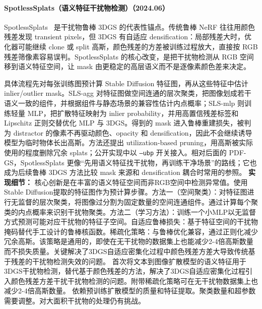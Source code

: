 \paragraph{SpotlessSplats（语义特征干扰物检测）（2024.06）}
SpotlessSplats~\cite{2406_20055} 是干扰物鲁棒 3DGS 的代表性锚点。传统鲁棒 NeRF 往往用颜色残差发现 transient pixels，但 3DGS 有自适应 densification：局部残差大时，优化器可能继续 clone 或 split 高斯，颜色残差的方差被训练过程放大，直接按 RGB 残差筛像素容易误判。SpotlessSplats 的核心改变，是把干扰物检测从 RGB 空间移到语义特征空间，让 mask 由更稳定的高层语义而不是逐像素颜色差来决定。

具体流程先对每张训练图预计算 Stable Diffusion 特征图，再从这些特征中估计 inlier/outlier mask。SLS-agg 对特征图做空间连通的层次聚类，把图像划成若干语义一致的组件，并根据组件与静态场景的兼容性估计内点概率；SLS-mlp 则训练轻量 MLP，把扩散特征映射为 inlier probability，并用高置信残差标签和 Lipschitz 正则交替优化 MLP 与 3DGS。得到的 mask 进入鲁棒重建损失，被判为 distractor 的像素不再驱动颜色、opacity 和 densification，因此不会继续诱导模型为临时物体长出高斯。方法还提出 utilization-based pruning，用高斯被实际使用的程度删除冗余 splats；公开实现中以 \texttt{--ubp} 开关接入。相对后面的 PDF-GS，SpotlessSplats 更像“先用语义特征找干扰物，再训练干净场景”的路线；它也成为后续鲁棒 3DGS 方法比较 mask 来源和 densification 耦合时常用的参照。
\textbf{实现细节：} 核心创新是在丰富的语义特征空间而非RGB空间中检测异常值。使用Stable Diffusion提取的特征图作为预计算步骤。方法一（空间聚类）：对特征图进行无监督的层次聚类，将图像过分割为固定数量的空间连通组件。通过计算每个聚类的内点概率来识别干扰物聚类。方法二（学习方法）：训练一个小MLP以无监督方式预测可能对应干扰物的特征子空间。自适应鲁棒损失：基于特征空间的干扰物掩码替代手工设计的鲁棒核函数。稀疏化策略：与鲁棒优化兼容，通过正则化减少冗余高斯。该策略是通用的，即使在无干扰物的数据集上也能减少2-4倍高斯数量而不损失质量。关键解决了3DGS自适应密集化过程中颜色残差方差大导致传统基于残差的干扰物检测失效的问题。 首次将文本到图像扩散模型的语义特征用于3DGS干扰物检测，替代基于颜色残差的方法，解决了3DGS自适应密集化过程引入颜色残差方差干扰干扰物检测的问题。附带稀疏化策略可在无干扰物数据集上也减少2-4倍高斯数量。 依赖预训练扩散模型的质量和特征提取。聚类数量和超参数需要调整。对大面积干扰物的处理仍有挑战。
